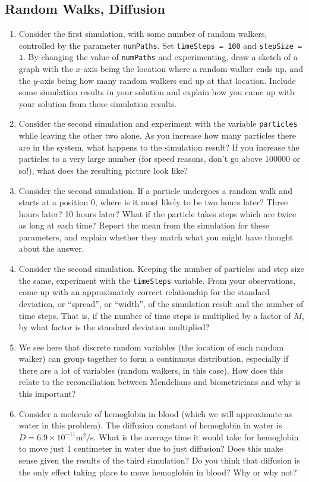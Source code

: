 \documentclass[12pt]{article}
\begin{document}
\subsection{Random Walks, Diffusion}
\begin{enumerate}
\item Consider the first simulation, with some number of random walkers, controlled by the parameter \verb|numPaths|. Set \verb|timeSteps = 100| and \verb|stepSize = 1|. By changing the value of \verb|numPaths| and experimenting, draw a sketch of a graph with the $x$-axis being the location where a random walker ends up, and the $y$-axis being how many random walkers end up at that location. Include some simulation results in your solution and explain how you came up with your solution from these simulation results.

\item Consider the second simulation and experiment with the variable \verb|particles| while leaving the other two alone. As you increase how many particles there are in the system, what happens to the simulation result? If you increase the particles to a very large number (for speed reasons, don't go above 100000 or so!), what does the resulting picture look like?

\item Consider the second simulation. If a particle undergoes a random walk and starts at a position 0, where is it most likely to be two hours later? Three hours later? 10 hours later? What if the particle takes steps which are twice as long at each time? Report the mean from the simulation for these parameters, and explain whether they match what you might have thought about the answer.

\item Consider the second simulation. Keeping the number of particles and step size the same, experiment with the \verb|timeSteps| variable. From your observations, come up with an approximately correct relationship for the standard deviation, or ``spread'', or ``width'', of the simulation result and the number of time steps. That is, if the number of time steps is multiplied by a factor of $M$, by what factor is the standard deviation multiplied?

\item We see here that discrete random variables (the location of each random walker) can group together to form a continuous distribution, especially if there are a lot of variables (random walkers, in this case). How does this relate to the reconciliation between Mendelians and biometricians and why is this important?

\item Consider a molecule of hemoglobin in blood (which we will approximate as water in this problem). The diffusion constant of hemoglobin in water is $D = 6.9\times 10^{-11} \textrm{m}^2/\textrm{s}$. What is the average time it would take for hemoglobin to move just 1 centimeter in water due to just diffusion? Does this make sense given the results of the third simulation? Do you think that diffusion is the only effect taking place to move hemoglobin in blood? Why or why not?
\end{enumerate}
\end{document}
